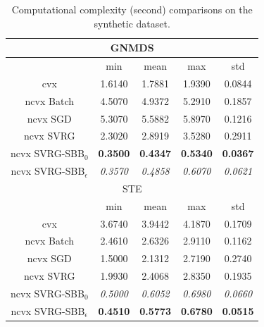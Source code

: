 \documentclass[letterpaper]{article} %
\begin{document}
{
	\begin{table}[tbh!]
		\centering
		\caption{Computational complexity (second) comparisons on the synthetic dataset.}
		\resizebox{0.9\columnwidth}{!}
		{
			\begin{tabular}{c||cccc}
				\hline
				\multicolumn{5}{c}{GNMDS} \\ \hline\hline
				                      & min     & mean   & max    & std     \\ \hline
				  cvx              & 1.6140  & 1.7881 & 1.9390 & 0.0844  \\ \hline
				  ncvx Batch    & 4.5070  & 4.9372 & 5.2910 & 0.1857  \\ \hline
				  ncvx SGD      & 5.3070  & 5.5882 & 5.8970 & 0.1216  \\ \hline
				  ncvx SVRG     & 2.3020  & 2.8919 & 3.5280 & 0.2911  \\ \hline
				  ncvx SVRG-SBB$_0$  & \textbf{0.3500}  & \textbf{0.4347} & \textbf{0.5340} & \textbf{0.0367}  \\ \hline
				  ncvx SVRG-SBB$_\epsilon$ & \textit{0.3570}  & \textit{0.4858} & \textit{0.6070} & \textit{0.0621}  \\
				\hline
				\multicolumn{5}{c}{STE} \\ \hline\hline
				                    & min     & mean   & max    & std     \\ \hline
				cvx             & 3.6740  & 3.9442 & 4.1870 & 0.1709  \\ \hline
				ncvx Batch    & 2.4610  & 2.6326 & 2.9110 & 0.1162  \\ \hline
				ncvx SGD      & 1.5000  & 2.1312 & 2.7190 & 0.2740  \\ \hline
				ncvx SVRG     & 1.9930  & 2.4068 & 2.8350 & 0.1935  \\ \hline
				ncvx SVRG-SBB$_0$  & \textit{0.5000}  & \textit{0.6052} & \textit{0.6980} & \textit{0.0660}  \\ \hline
				ncvx SVRG-SBB$_\epsilon$ & \textbf{0.4510}  & \textbf{0.5773} & \textbf{0.6780} & \textbf{0.0515} \\

\end{tabular}}
\end{table}}
\end{document}
